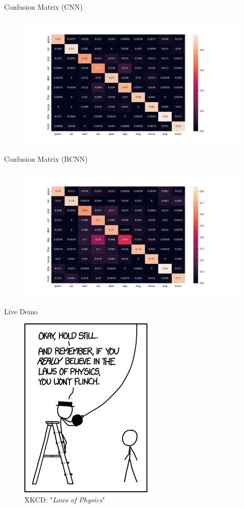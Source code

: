 \documentclass{beamer}
\begin{document}
\begin{frame}{Confusion Matrix (CNN)}
	\begin{figure}
		\includegraphics[width=.95\textwidth]{../Images/CNN_confusion_matrix.png}
	\end{figure}
\end{frame}

\begin{frame}{Confusion Matrix (BCNN)}
	\begin{figure}
		\includegraphics[width=.95\textwidth]{../Images/BNN_confusion_matrix.png}
	\end{figure}
\end{frame}

\begin{frame}{Live Demo}
	\begin{figure}
		\includegraphics[width=.35\textwidth]{../Images/xkcd_laws_of_physics.png}
		\caption{XKCD: "\textit{Laws of Physics}" \cite{xkcd-laws-of-physics}}
	\end{figure}
\end{frame}
\end{document}

